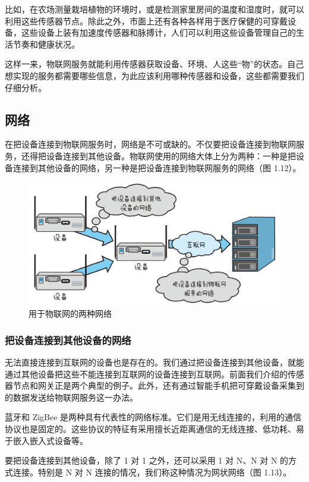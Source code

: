 \documentclass[12pt,UTF8]{ctexbook}
\begin{document}
比如，在农场测量栽培植物的环境时，或是检测家里房间的温度和湿度时，就可以利用这些传感器节点。除此之外，市面上还有各种各样用于医疗保健的可穿戴设备，这些设备上装有加速度传感器和脉搏计，人们可以利用这些设备管理自己的生活节奏和健康状况。

这样一来，物联网服务就能利用传感器获取设备、环境、人这些“物”的状态。自己想实现的服务都需要哪些信息，为此应该利用哪种传感器和设备，这些都需要我们仔细分析。

\subsection{网络}

在把设备连接到物联网服务时，网络是不可或缺的。不仅要把设备连接到物联网服务，还得把设备连接到其他设备。物联网使用的网络大体上分为两种：一种是把设备连接到其他设备的网络，另一种是把设备连接到物联网服务的网络（图 1.12）。

\begin{figure}[htbp]
	\centering
	\includegraphics[width=1\linewidth]{12}
	\caption{用于物联网的两种网络}
	\label{fig:1}
\end{figure}

\subsubsection{把设备连接到其他设备的网络}

无法直接连接到互联网的设备也是存在的。我们通过把设备连接到其他设备，就能通过其他设备把这些不能连接到互联网的设备连接到互联网。前面我们介绍的传感器节点和网关正是两个典型的例子。此外，还有通过智能手机把可穿戴设备采集到的数据发送给物联网服务这一办法。

蓝牙和 ZigBee 是两种具有代表性的网络标准。它们是用无线连接的，利用的通信协议也是固定的。这些协议的特征有采用擅长近距离通信的无线连接、低功耗、易于嵌入嵌入式设备等。

要把设备连接到其他设备，除了 1 对 1 之外，还可以采用 1 对 N、N 对 N 的方式连接。特别是 N 对 N 连接的情况，我们称这种情况为网状网络（图 1.13）。
\end{document}

